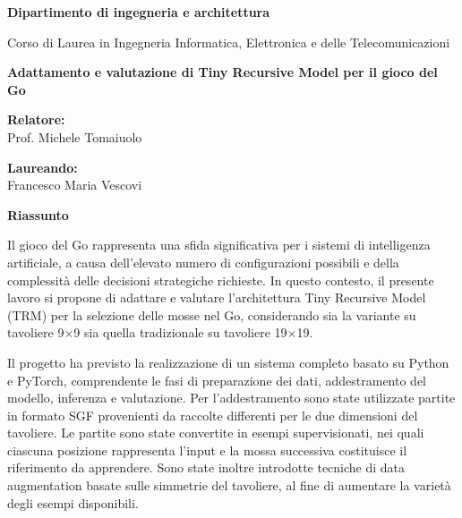 \documentclass[a4paper,11pt]{article}
\begin{document}
\textbf{Dipartimento di ingegneria e architettura}

{\normalsize Corso di Laurea in Ingegneria Informatica, Elettronica e delle Telecomunicazioni}


\begin{center}

    \vspace{0.6em}

    {\normalsize\bfseries Adattamento e valutazione di Tiny Recursive Model per il gioco del Go}

    \vspace{0.35em}

    \begin{minipage}[t]{0.48\textwidth}
        \begin{flushleft}
            \textbf{Relatore:} \\
            Prof. Michele Tomaiuolo \\[0.4cm]
        \end{flushleft}
    \end{minipage}
    \hfill
    \begin{minipage}[t]{0.48\textwidth}
        \begin{flushright}
            \textbf{Laureando:} \\
            Francesco Maria Vescovi
        \end{flushright}
    \end{minipage}


\end{center}

{\large\bfseries Riassunto}

Il gioco del Go rappresenta una sfida significativa per i sistemi di intelligenza artificiale, a causa dell'elevato numero di configurazioni possibili e della complessità delle decisioni strategiche richieste. In questo contesto, il presente lavoro si propone di adattare e valutare l'architettura Tiny Recursive Model (TRM) per la selezione delle mosse nel Go, considerando sia la variante su tavoliere 9$\times$9 sia quella tradizionale su tavoliere 19$\times$19.

Il progetto ha previsto la realizzazione di un sistema completo basato su Python e PyTorch, comprendente le fasi di preparazione dei dati, addestramento del modello, inferenza e valutazione. Per l'addestramento sono state utilizzate partite in formato SGF provenienti da raccolte differenti per le due dimensioni del tavoliere. Le partite sono state convertite in esempi supervisionati, nei quali ciascuna posizione rappresenta l'input e la mossa successiva costituisce il riferimento da apprendere. Sono state inoltre introdotte tecniche di data augmentation basate sulle simmetrie del tavoliere, al fine di aumentare la varietà degli esempi disponibili.
\end{document}
